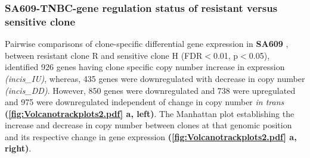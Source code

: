 \subsubsection{SA609-TNBC-gene regulation status of resistant versus sensitive clone}
Pairwise comparisons of clone-specific differential gene expression in \textbf{SA609} , between resistant clone R and sensitive clone H (FDR$<$0.01, p$<$0.05), identified 926 genes having clone specific copy number increase in expression \textit{(incis\_IU)}, whereas, 435 genes were downregulated with decrease in copy number \textit{(incis\_DD)}. However, 850 genes were downregulated and 738 were upregulated and 975 were downregulated independent of change in copy number \textit{in trans} \textbf{(\autoref{fig:Volcanotrackplots2.pdf} a, left)}. The Manhattan plot establishing the increase and decrease in copy number between clones at that genomic position and its respective change in gene expression \textbf{(\autoref{fig:Volcanotrackplots2.pdf} a, right)}.


